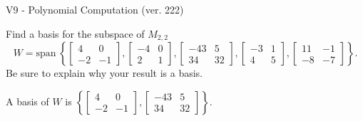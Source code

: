 \begin{exercise}
  \begin{exerciseTitle}V9 - Polynomial Computation (ver. 222)\end{exerciseTitle}
  \begin{exerciseStatement}
    Find a basis for the subspace of \(M_{2,2}\) 
\[W=\mathrm{span}\ \left\{\left[\begin{array}{cc}
4 & 0 \\
-2 & -1
\end{array}\right] , \left[\begin{array}{cc}
-4 & 0 \\
2 & 1
\end{array}\right] , \left[\begin{array}{cc}
-43 & 5 \\
34 & 32
\end{array}\right] , \left[\begin{array}{cc}
-3 & 1 \\
4 & 5
\end{array}\right] , \left[\begin{array}{cc}
11 & -1 \\
-8 & -7
\end{array}\right]\right\}.\]
 Be sure to explain why your result is a basis.


  \end{exerciseStatement}
  \begin{exerciseAnswer}
   A basis of \(W\) is  \(\left\{\left[\begin{array}{cc}
4 & 0 \\
-2 & -1
\end{array}\right] , \left[\begin{array}{cc}
-43 & 5 \\
34 & 32
\end{array}\right]\right\}\).
  


  \end{exerciseAnswer}
\end{exercise}